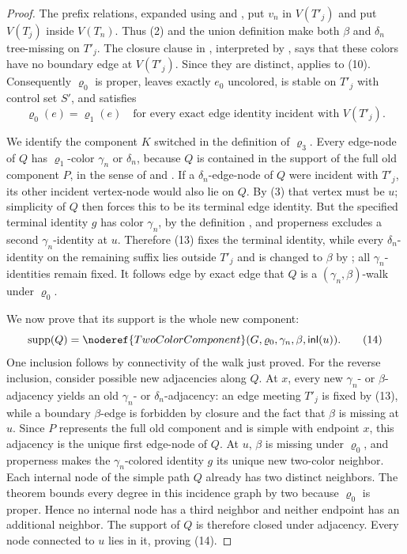 \begin{proof}
The prefix relations, expanded using
 and
, put \(v_n\) in \(V(T'_j)\) and put
\(V(T_j)\) inside \(V(T_n)\).  Thus (2) and the union definition
 make both \(\beta\) and \(\delta_n\)
tree-missing on \(T'_j\).  The closure clause in
, interpreted by
, says that these colors have no boundary
edge at \(V(T'_j)\).  Since they are distinct,
 applies to (10).  Consequently
\(\varrho_0\) is proper, leaves exactly \(e_0\) uncolored, is stable on
\(T'_j\) with control set \(S'\), and satisfies
\[
 \varrho_0(e)=\varrho_1(e)
 \quad\text{for every exact edge identity incident with }V(T'_j). \tag{13}
\]

We identify the component \(K\) switched in the definition of
\(\varrho_3\).  Every edge-node of \(Q\) has
\(\varrho_1\)-color \(\gamma_n\) or \(\delta_n\), because \(Q\) is
contained in the support of the full old component \(P\), in the sense
of  and
.  If a \(\delta_n\)-edge-node of \(Q\)
were incident with \(T'_j\), its other incident vertex-node would also
lie on \(Q\).  By (3) that vertex must be \(u\); simplicity of \(Q\)
then forces this to be its terminal edge identity.  But the specified
terminal identity \(g\) has color \(\gamma_n\), by the definition
, and properness
 excludes a second
\(\gamma_n\)-identity at \(u\).  Therefore (13) fixes the terminal
identity, while every \(\delta_n\)-identity on the remaining suffix lies
outside \(T'_j\) and is changed to \(\beta\) by
; all \(\gamma_n\)-identities remain fixed.
It follows edge by exact edge that \(Q\) is a
\((\gamma_n,\beta)\)-walk under \(\varrho_0\).

We now prove that its support is the whole new component:
\[
 \operatorname{supp}(Q)
 =\noderef{TwoColorComponent}
   (G,\varrho_0,\gamma_n,\beta,\mathsf{inl}(u)).               \tag{14}
\]
One inclusion follows by connectivity of the walk just proved.  For the
reverse inclusion, consider possible new adjacencies along \(Q\).
At \(x\), every new \(\gamma_n\)- or \(\beta\)-adjacency yields an old
\(\gamma_n\)- or \(\delta_n\)-adjacency: an edge meeting \(T'_j\) is
fixed by (13), while a boundary \(\beta\)-edge is forbidden by closure
and the fact that \(\beta\) is missing at \(u\).  Since \(P\) represents
the full old component and is simple with endpoint \(x\), this adjacency
is the unique first edge-node of \(Q\).  At \(u\), \(\beta\) is missing
under \(\varrho_0\), and properness makes the
\(\gamma_n\)-colored identity \(g\) its unique new two-color neighbor.
Each internal node of the simple path \(Q\) already has two distinct
neighbors.  The theorem
 bounds every degree in this
incidence graph by two because \(\varrho_0\) is proper.  Hence no
internal node has a third neighbor and neither endpoint has an additional
neighbor.  The support of \(Q\) is therefore closed under adjacency.
Every node connected to \(u\) lies in it, proving (14).


\end{proof}
